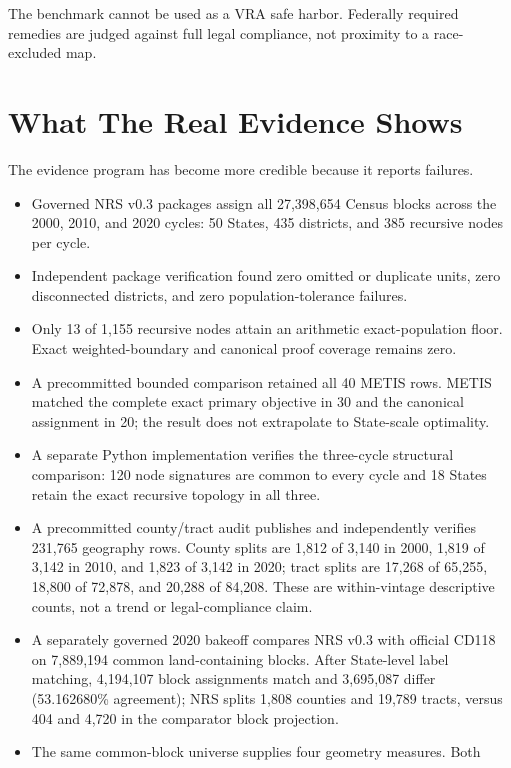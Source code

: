 \documentclass[11pt,twocolumn]{article}
\begin{document}
The benchmark cannot be used as a VRA safe harbor. Federally required remedies
are judged against full legal compliance, not proximity to a race-excluded map.

\section*{What The Real Evidence Shows}

The evidence program has become more credible because it reports failures.

\begin{itemize}[leftmargin=*,nosep]
\item Governed NRS v0.3 packages assign all 27,398,654 Census blocks across
the 2000, 2010, and 2020 cycles: 50 States, 435 districts, and 385 recursive
nodes per cycle.
\item Independent package verification found zero omitted or duplicate units,
zero disconnected districts, and zero population-tolerance failures.
\item Only 13 of 1,155 recursive nodes attain an arithmetic exact-population
floor. Exact weighted-boundary and canonical proof coverage remains zero.
\item A precommitted bounded comparison retained all 40 METIS rows. METIS
matched the complete exact primary objective in 30 and the canonical assignment
in 20; the result does not extrapolate to State-scale optimality.
\item A separate Python implementation verifies the three-cycle structural
comparison: 120 node signatures are common to every cycle and 18 States retain
the exact recursive topology in all three.
\item A precommitted county/tract audit publishes and independently verifies
231,765 geography rows. County splits are 1,812 of 3,140 in 2000, 1,819 of
3,142 in 2010, and 1,823 of 3,142 in 2020; tract splits are 17,268 of 65,255,
18,800 of 72,878, and 20,288 of 84,208. These are within-vintage descriptive
counts, not a trend or legal-compliance claim.
\item A separately governed 2020 bakeoff compares NRS v0.3 with official
CD118 on 7,889,194 common land-containing blocks. After State-level label
matching, 4,194,107 block assignments match and 3,695,087 differ
(53.162680\% agreement); NRS splits 1,808 counties and 19,789 tracts, versus
404 and 4,720 in the comparator block projection.
\item The same common-block universe supplies four geometry measures. Both

\end{itemize}
\end{document}
